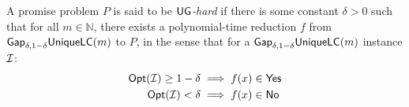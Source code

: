 \begin{definition}
  A promise problem $P$ is said to be \emph{$\mathsf{UG}$-hard} if there is some constant $\delta > 0$ such that for all $m \in \mathbb{N}$, there exists a polynomial-time reduction $f$ from $\mathsf{Gap}_{\delta, 1-\delta}\mathsf{UniqueLC}(m)$ to $P$, in the sense that for a $\mathsf{Gap}_{\delta, 1-\delta}\mathsf{UniqueLC}(m)$ instance $\mathcal{I}$:
  \begin{align*}
    \mathsf{Opt}(\mathcal{I})  \geq 1 - \delta & \implies f(x) \in \mathsf{Yes} \\
    \mathsf{Opt}(\mathcal{I})  < \delta & \implies f(x) \in \mathsf{No}
  \end{align*}
\end{definition}

